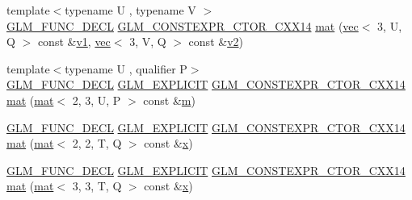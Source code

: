 \begin{DoxyCompactItemize}
\item 
{\footnotesize template$<$typename U , typename V $>$ }\\\mbox{\hyperlink{setup_8hpp_ab2d052de21a70539923e9bcbf6e83a51}{G\+L\+M\+\_\+\+F\+U\+N\+C\+\_\+\+D\+E\+CL}} \mbox{\hyperlink{setup_8hpp_a0900f9145e68bf6061b6f5e7be3fa751}{G\+L\+M\+\_\+\+C\+O\+N\+S\+T\+E\+X\+P\+R\+\_\+\+C\+T\+O\+R\+\_\+\+C\+X\+X14}} \mbox{\hyperlink{structglm_1_1mat_3_012_00_013_00_01_t_00_01_q_01_4_adac199e52e2fbdfe33f528a5aef395bc}{mat}} (\mbox{\hyperlink{structglm_1_1vec}{vec}}$<$ 3, U, Q $>$ const \&\mbox{\hyperlink{_s_d_l__opengl__glext_8h_a435c176a02c061b43e19bdf7c86cceae}{v1}}, \mbox{\hyperlink{structglm_1_1vec}{vec}}$<$ 3, V, Q $>$ const \&\mbox{\hyperlink{_s_d_l__opengl__glext_8h_a0928f6d0f0f794ba000a21dfae422136}{v2}})
\item 
{\footnotesize template$<$typename U , qualifier P$>$ }\\\mbox{\hyperlink{setup_8hpp_ab2d052de21a70539923e9bcbf6e83a51}{G\+L\+M\+\_\+\+F\+U\+N\+C\+\_\+\+D\+E\+CL}} \mbox{\hyperlink{setup_8hpp_a6c74f5a5e7b134ab69023ff9a30d4d5d}{G\+L\+M\+\_\+\+E\+X\+P\+L\+I\+C\+IT}} \mbox{\hyperlink{setup_8hpp_a0900f9145e68bf6061b6f5e7be3fa751}{G\+L\+M\+\_\+\+C\+O\+N\+S\+T\+E\+X\+P\+R\+\_\+\+C\+T\+O\+R\+\_\+\+C\+X\+X14}} \mbox{\hyperlink{structglm_1_1mat_3_012_00_013_00_01_t_00_01_q_01_4_a1c561950eeef2c86735f4c6a65a8f1d8}{mat}} (\mbox{\hyperlink{structglm_1_1mat}{mat}}$<$ 2, 3, U, P $>$ const \&\mbox{\hyperlink{_s_d_l__opengl__glext_8h_af593500c283bf1a787a6f947f503a5c2}{m}})
\item 
\mbox{\hyperlink{setup_8hpp_ab2d052de21a70539923e9bcbf6e83a51}{G\+L\+M\+\_\+\+F\+U\+N\+C\+\_\+\+D\+E\+CL}} \mbox{\hyperlink{setup_8hpp_a6c74f5a5e7b134ab69023ff9a30d4d5d}{G\+L\+M\+\_\+\+E\+X\+P\+L\+I\+C\+IT}} \mbox{\hyperlink{setup_8hpp_a0900f9145e68bf6061b6f5e7be3fa751}{G\+L\+M\+\_\+\+C\+O\+N\+S\+T\+E\+X\+P\+R\+\_\+\+C\+T\+O\+R\+\_\+\+C\+X\+X14}} \mbox{\hyperlink{structglm_1_1mat_3_012_00_013_00_01_t_00_01_q_01_4_a66345b384cd179e59bb2f137736bc228}{mat}} (\mbox{\hyperlink{structglm_1_1mat}{mat}}$<$ 2, 2, T, Q $>$ const \&\mbox{\hyperlink{_s_d_l__opengl_8h_ad0e63d0edcdbd3d79554076bf309fd47}{x}})
\item 
\mbox{\hyperlink{setup_8hpp_ab2d052de21a70539923e9bcbf6e83a51}{G\+L\+M\+\_\+\+F\+U\+N\+C\+\_\+\+D\+E\+CL}} \mbox{\hyperlink{setup_8hpp_a6c74f5a5e7b134ab69023ff9a30d4d5d}{G\+L\+M\+\_\+\+E\+X\+P\+L\+I\+C\+IT}} \mbox{\hyperlink{setup_8hpp_a0900f9145e68bf6061b6f5e7be3fa751}{G\+L\+M\+\_\+\+C\+O\+N\+S\+T\+E\+X\+P\+R\+\_\+\+C\+T\+O\+R\+\_\+\+C\+X\+X14}} \mbox{\hyperlink{structglm_1_1mat_3_012_00_013_00_01_t_00_01_q_01_4_abab129cea1f004a6341b1ed2691600f4}{mat}} (\mbox{\hyperlink{structglm_1_1mat}{mat}}$<$ 3, 3, T, Q $>$ const \&\mbox{\hyperlink{_s_d_l__opengl_8h_ad0e63d0edcdbd3d79554076bf309fd47}{x}})

\end{DoxyCompactItemize}
